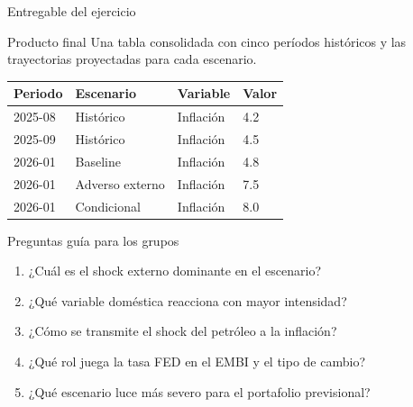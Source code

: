 \begin{frame}{Entregable del ejercicio}

\begin{block}{Producto final}
Una tabla consolidada con cinco períodos históricos y las trayectorias proyectadas para cada escenario.
\end{block}

\begin{table}
\centering
\small
\begin{tabular}{llll}
\toprule
Periodo & Escenario & Variable & Valor \\
\midrule
2025-08 & Histórico & Inflación & 4.2 \\
2025-09 & Histórico & Inflación & 4.5 \\
2026-01 & Baseline & Inflación & 4.8 \\
2026-01 & Adverso externo & Inflación & 7.5 \\
2026-01 & Condicional & Inflación & 8.0 \\
\bottomrule
\end{tabular}
\end{table}

\end{frame}

\begin{frame}{Preguntas guía para los grupos}

\begin{enumerate}
    \item ¿Cuál es el shock externo dominante en el escenario?
    \item ¿Qué variable doméstica reacciona con mayor intensidad?
    \item ¿Cómo se transmite el shock del petróleo a la inflación?
    \item ¿Qué rol juega la tasa FED en el EMBI y el tipo de cambio?
    \item ¿Qué escenario luce más severo para el portafolio previsional?
\end{enumerate}

\end{frame}